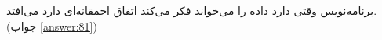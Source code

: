 \section{}
\paragraph{}\label{hint:309}
برنامه‌نویس وقتی دارد داده  را می‌خواند فکر می‌کند اتفاق احمقانه‌ای دارد می‌افتد. (جواب \ref{answer:81})